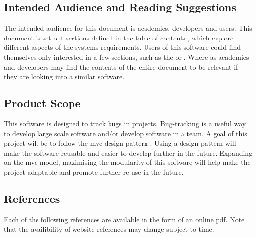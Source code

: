 \documentclass{article}
\newcommand{\comment}[1]{}
\begin{document}
\subsection{Intended Audience and Reading Suggestions}
\comment{
Descibe the different types of reader that the document is inteded for, such as developers, project managers, marketing staff, users, testers, and documentation writers. Describe what the rest of the STS contains and how it is organised. Suggest a sequenc for reading the document, beginning with the overview sections and proceeding throught the sections that are most pertinent to each reader type.
}
The intended audience for this document is academics, developers and users. This document is set out sections defined in the table of contents , which explore different aspects of the systems requirements. Users of this software could find themselves only interested in a few sections, such as the  or . Where as academics and developers may find the contents of the entire document to be relevant if they are looking into a similar software.
\subsection{Product Scope}\label{scope}
\comment{
Provide a short decription of the software being specified and its purpose, including relevant benefits, objectives and goals. Relate the software to corporate goals or business strategies. If a separate vision and scope document is available, refer to it rather than duplicating its contents here.
}
This software is designed to track bugs in projects. Bug-tracking is a useful way to develop large scale software and/or develop software in a team. A goal of this project will be to follow the \acrlong{mvc} design pattern \parencite{designpatterns97}. Using a design pattern will make the software reusable and easier to develop further in the future. Expanding on the \acrshort{mvc} model, maximising the modularity of this software will help make the project adaptable and promote further re-use in the future. 
\subsection{References}
\comment{
If a seperate reader could access a copy of each reference, including title, author, version number, date, and source or location.
	}
Each of the following references are available in the form of an online pdf. Note that the availibility of website references may change subject to time.
\printbibliography
\newpage
\end{document}
